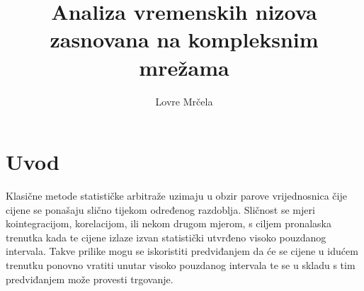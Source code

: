 \documentclass[lmodern, utf8, diplomski, numeric]{fer}
\begin{document}

\title{Analiza vremenskih nizova zasnovana na kompleksnim mrežama}

\author{Lovre Mrčela}

\maketitle



\tableofcontents

\chapter{Uvod}
  Klasične metode statističke arbitraže uzimaju u obzir parove vrijednosnica čije cijene se ponašaju slično tijekom određenog razdoblja.
  Sličnost se mjeri kointegracijom, korelacijom, ili nekom drugom mjerom, s ciljem pronalaska trenutka kada te cijene izlaze izvan statistički utvrđeno visoko pouzdanog intervala.
  Takve prilike mogu se iskoristiti predviđanjem da će se cijene u idućem trenutku ponovno vratiti unutar visoko pouzdanog intervala te se u skladu s tim predviđanjem može provesti trgovanje.
  
\end{document}
